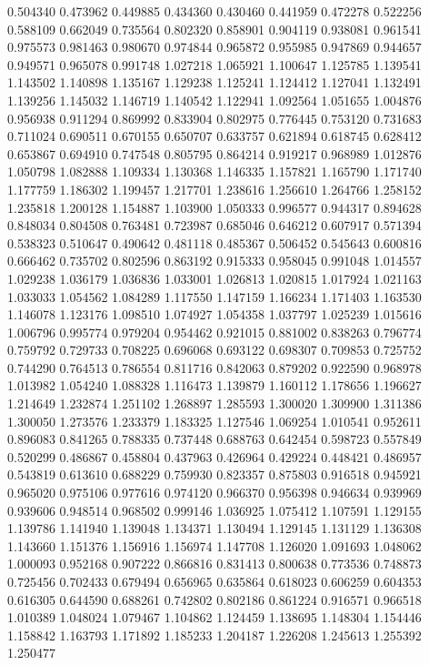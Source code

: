 0.504340
0.473962
0.449885
0.434360
0.430460
0.441959
0.472278
0.522256
0.588109
0.662049
0.735564
0.802320
0.858901
0.904119
0.938081
0.961541
0.975573
0.981463
0.980670
0.974844
0.965872
0.955985
0.947869
0.944657
0.949571
0.965078
0.991748
1.027218
1.065921
1.100647
1.125785
1.139541
1.143502
1.140898
1.135167
1.129238
1.125241
1.124412
1.127041
1.132491
1.139256
1.145032
1.146719
1.140542
1.122941
1.092564
1.051655
1.004876
0.956938
0.911294
0.869992
0.833904
0.802975
0.776445
0.753120
0.731683
0.711024
0.690511
0.670155
0.650707
0.633757
0.621894
0.618745
0.628412
0.653867
0.694910
0.747548
0.805795
0.864214
0.919217
0.968989
1.012876
1.050798
1.082888
1.109334
1.130368
1.146335
1.157821
1.165790
1.171740
1.177759
1.186302
1.199457
1.217701
1.238616
1.256610
1.264766
1.258152
1.235818
1.200128
1.154887
1.103900
1.050333
0.996577
0.944317
0.894628
0.848034
0.804508
0.763481
0.723987
0.685046
0.646212
0.607917
0.571394
0.538323
0.510647
0.490642
0.481118
0.485367
0.506452
0.545643
0.600816
0.666462
0.735702
0.802596
0.863192
0.915333
0.958045
0.991048
1.014557
1.029238
1.036179
1.036836
1.033001
1.026813
1.020815
1.017924
1.021163
1.033033
1.054562
1.084289
1.117550
1.147159
1.166234
1.171403
1.163530
1.146078
1.123176
1.098510
1.074927
1.054358
1.037797
1.025239
1.015616
1.006796
0.995774
0.979204
0.954462
0.921015
0.881002
0.838263
0.796774
0.759792
0.729733
0.708225
0.696068
0.693122
0.698307
0.709853
0.725752
0.744290
0.764513
0.786554
0.811716
0.842063
0.879202
0.922590
0.968978
1.013982
1.054240
1.088328
1.116473
1.139879
1.160112
1.178656
1.196627
1.214649
1.232874
1.251102
1.268897
1.285593
1.300020
1.309900
1.311386
1.300050
1.273576
1.233379
1.183325
1.127546
1.069254
1.010541
0.952611
0.896083
0.841265
0.788335
0.737448
0.688763
0.642454
0.598723
0.557849
0.520299
0.486867
0.458804
0.437963
0.426964
0.429224
0.448421
0.486957
0.543819
0.613610
0.688229
0.759930
0.823357
0.875803
0.916518
0.945921
0.965020
0.975106
0.977616
0.974120
0.966370
0.956398
0.946634
0.939969
0.939606
0.948514
0.968502
0.999146
1.036925
1.075412
1.107591
1.129155
1.139786
1.141940
1.139048
1.134371
1.130494
1.129145
1.131129
1.136308
1.143660
1.151376
1.156916
1.156974
1.147708
1.126020
1.091693
1.048062
1.000093
0.952168
0.907222
0.866816
0.831413
0.800638
0.773536
0.748873
0.725456
0.702433
0.679494
0.656965
0.635864
0.618023
0.606259
0.604353
0.616305
0.644590
0.688261
0.742802
0.802186
0.861224
0.916571
0.966518
1.010389
1.048024
1.079467
1.104862
1.124459
1.138695
1.148304
1.154446
1.158842
1.163793
1.171892
1.185233
1.204187
1.226208
1.245613
1.255392
1.250477
